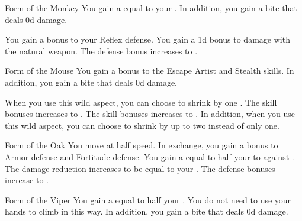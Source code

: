 {            %
            \begin{freeability}{Form of the Monkey}
                You gain a  equal to your .
                In addition, you gain a bite  that deals \plus0d damage.

                \rankline
                 You gain a  bonus to your Reflex defense.
                 You gain a \plus1d bonus to damage with the natural weapon.
                 The defense bonus increases to .
            \end{freeability}

            \begin{freeability}{Form of the Mouse}
                You gain a  bonus to the Escape Artist and Stealth skills.
                In addition, you gain a bite  that deals \plus0d damage.
                
                \rankline
                 When you use this wild aspect, you can choose to shrink by one .
                 The skill bonuses increases to .
                 The skill bonuses increases to . In addition, when you use this wild aspect, you can choose to shrink by up to two  instead of only one.
            \end{freeability}

            \begin{freeability}{Form of the Oak}
                You move at half speed.
                In exchange, you gain a  bonus to Armor defense and Fortitude defense.
                \rankline
                 You gain a  equal to half your  to  against .
                 The damage reduction increases to be equal to your .
                 The defense bonuses increase to .
            \end{freeability}

            \begin{freeability}{Form of the Viper}
                You gain a  equal to half your .
                You do not need to use your hands to climb in this way.
                In addition, you gain a bite  that deals \plus0d damage.


\end{freeability}}
